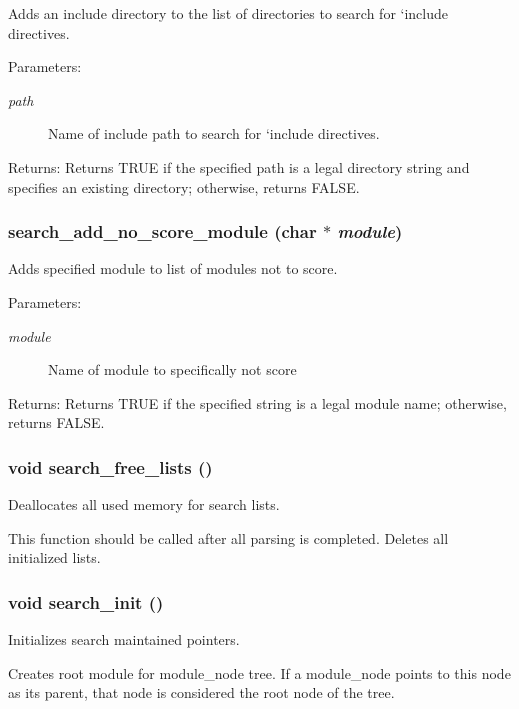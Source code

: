Adds an include directory to the list of directories to search for `include directives.

\begin{Desc}
\item[Parameters:]
\begin{description}
\item[{\em path}]Name of include path to search for `include directives. \end{description}
\end{Desc}
\begin{Desc}
\item[Returns:]Returns TRUE if the specified path is a legal directory string and specifies an existing directory; otherwise, returns FALSE. \end{Desc}
\subsubsection{ search\_\-add\_\-no\_\-score\_\-module (char $\ast$ {\em module})}\label{search_8h_a4}


Adds specified module to list of modules not to score.

\begin{Desc}
\item[Parameters:]
\begin{description}
\item[{\em module}]Name of module to specifically not score \end{description}
\end{Desc}
\begin{Desc}
\item[Returns:]Returns TRUE if the specified string is a legal module name; otherwise, returns FALSE. \end{Desc}
\subsubsection{\setlength{\rightskip}{0pt plus 5cm}void search\_\-free\_\-lists ()}\label{search_8h_a6}


Deallocates all used memory for search lists.

This function should be called after all parsing is completed. Deletes all initialized lists. 
\subsubsection{\setlength{\rightskip}{0pt plus 5cm}void search\_\-init ()}\label{search_8h_a0}


Initializes search maintained pointers.

Creates root module for module\_\-node tree. If a module\_\-node points to this node as its parent, that node is considered the root node of the tree. 